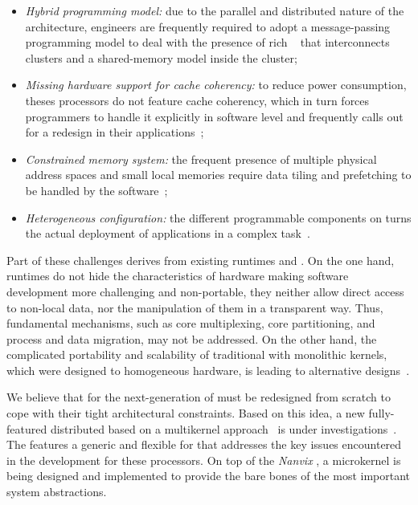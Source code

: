 	\begin{itemize}
		\item \textit{Hybrid programming model:} due to the parallel and
		distributed nature of the architecture, engineers are frequently
		required to adopt a message-passing programming model to deal
		with the presence of rich \nocs~\cite{kelly2013} that
		interconnects clusters and a shared-memory model inside the
		cluster;

		\item \textit{Missing hardware support for cache coherency:} to
		reduce power consumption, theses processors do not feature cache
		coherency, which in turn forces programmers to handle it
		explicitly in software level and frequently calls out for a
		redesign in their applications~\cite{francesquini2015};

		\item \textit{Constrained memory system:} the frequent presence
		of multiple physical address spaces and small local memories
		require data tiling and prefetching to be handled by the
		software~\cite{Castro2016};

		\item \textit{Heterogeneous configuration:} the different
		programmable components on \lightweight \manycores turns the
		actual deployment of applications in a complex
		task~\cite{barbalace2015}.
	\end{itemize}

	Part of these challenges derives from existing runtimes and \oss.
	On the one hand, runtimes do not hide the characteristics of hardware
	making software development more challenging and non-portable, \eg they
	neither allow direct access to non-local data, nor the manipulation of
	them in a transparent way. Thus, fundamental \os mechanisms, such
	as core multiplexing, core partitioning, and process and data
	migration, may not be addressed. On the other hand, the complicated
	portability and scalability of traditional \oss with monolithic
	kernels, which were designed to homogeneous hardware, is leading to
	alternative \os designs~\cite{Baumann2009, kluge2014, nightingale2009, rhoden2011}.

	We believe that \oss for the next-generation of \lightweight
	\manycores must be redesigned from scratch to cope with their tight
	architectural constraints. Based on this idea, a new fully-featured
	distributed \os based on a multikernel approach~\cite{Baumann2009}
	is under investigations~\cite{penna2017-1,penna2017-2,penna2019}.
	The \textit{\nanvixmultikernel} features a generic and flexible \hal for
	\lightweight \manycores that addresses the key issues encountered in
	the development for these processors. On top of the \textit{Nanvix \hal},
	a microkernel is being designed and implemented to provide the bare bones
	of the most important system abstractions.

